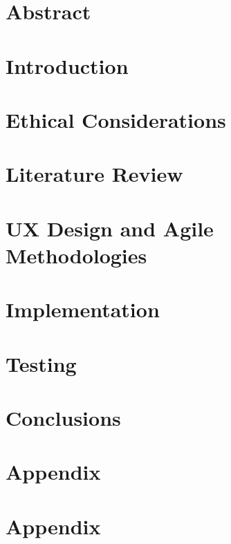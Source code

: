 \documentclass[oneside,openright,titlepage,numbers=noenddot,headinclude,footinclude=true,cleardoublepage=empty,listof=totoc,paper=a4,fontsize=11pt,english,BCOR=5mm]{scrreprt}
\begin{document}
  \frenchspacing
  \raggedbottom{}

  \pagestyle{plain}

  \singlespacing{}
  
  

  \onehalfspacing{}
  

  \chapter*{Abstract}
  

  

  \cleardoublepage{}
  \pagestyle{scrheadings}
  \onehalfspacing{}

  \chapter{Introduction}\label{c:Introduction}
  

  \chapter{Ethical Considerations}\label{c:Ethical-Considerations}
  

  \chapter{Literature Review}\label{c:Literature-Review}
  

  \chapter{UX Design and Agile Methodologies}\label{c:UX-Design-Agile-Methodologies}
  

  \chapter{Implementation}\label{c:Implementation}
  

  \chapter{Testing}\label{c:Testing}
  

  \chapter{Conclusions}\label{c:Conclusions}
  

  \cleardoublepage{}
  \appendix

  \singlespacing{}
  
  \chapter{Appendix}\label{c:Appendix-A}
  
  \chapter{Appendix}\label{c:Appendix-B}
  
  \cleardoublepage{}
\end{document}
